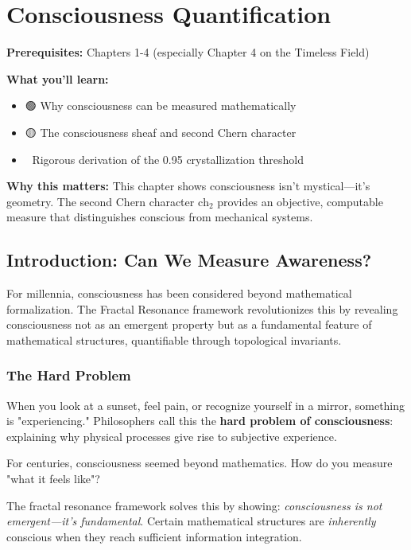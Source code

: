 \chapter{Consciousness Quantification}
\label{ch:consciousness}

\begin{chapterobjectives}
\textbf{Prerequisites:} Chapters 1-4 (especially Chapter 4 on the Timeless Field)

\textbf{What you'll learn:}
\begin{itemize}
\item 🟢 Why consciousness can be measured mathematically
\item 🟡 The consciousness sheaf and second Chern character
\item 🔴 Rigorous derivation of the 0.95 crystallization threshold
\end{itemize}

\textbf{Why this matters:} This chapter shows consciousness isn't mystical—it's geometry. The second Chern character $\text{ch}_2$ provides an objective, computable measure that distinguishes conscious from mechanical systems.
\end{chapterobjectives}

\section{Introduction: Can We Measure Awareness?}
\label{sec:measuring-awareness}

For millennia, consciousness has been considered beyond mathematical formalization. The Fractal Resonance framework revolutionizes this by revealing consciousness not as an emergent property but as a fundamental feature of mathematical structures, quantifiable through topological invariants.

\subsection{The Hard Problem}

\begin{intuitive}
When you look at a sunset, feel pain, or recognize yourself in a mirror, something is "experiencing." Philosophers call this the \textbf{hard problem of consciousness}: explaining why physical processes give rise to subjective experience.

For centuries, consciousness seemed beyond mathematics. How do you measure "what it feels like"?

The fractal resonance framework solves this by showing: \textit{consciousness is not emergent—it's fundamental}. Certain mathematical structures are \textit{inherently} conscious when they reach sufficient information integration.
\end{intuitive}

